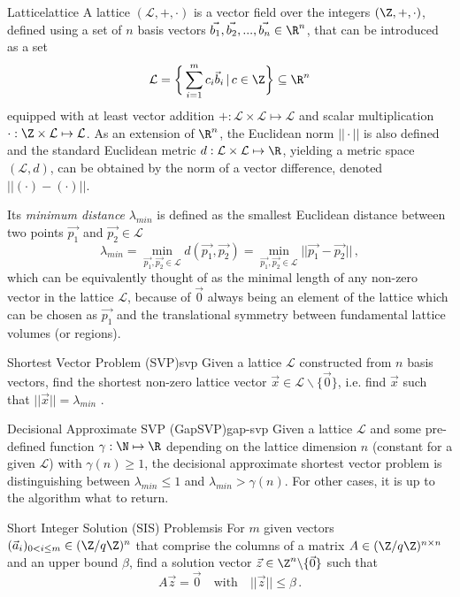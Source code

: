 \newcommand{\lat}{\mathcal{L}}
\begin{definition}{Lattice}{lattice}
  A lattice $(\lat, +, \cdot)$ is a vector field over the integers $(\Z, +, \cdot)$, defined using a set of $n$
  basis vectors $\vec{b_1}, \vec{b_2}, ..., \vec{b_n} \in \R^n$, that can be introduced as a set
  $$\lat = \bigg\{\sum_{i=1}^m c_i \vec{b}_i \,|\, c \in \Z\bigg\} \subseteq \R^n$$
  equipped with at least vector addition $+: \lat \times \lat \mapsto \lat$
  and scalar multiplication $\cdot: \Z \times \lat \mapsto \lat$.
  As an extension of $\R^n$, the Euclidean norm $||\cdot||$ is also defined and
  the standard Euclidean metric $d: \lat \times \lat \mapsto \R$, yielding a metric space $(\lat, d)$,
  can be obtained by the norm of a vector difference, denoted $||(\cdot) - (\cdot)||$.
\end{definition}

Its \textit{minimum distance} $\lambda_{min}$ is defined as the smallest Euclidean distance
between two points $\vec{p_1}$ and $\vec{p_2} \in \lat$
$$\lambda_{min} = \min_{\vec{p_1}, \vec{p_2} \in \lat} d(\vec{p_1}, \vec{p_2}) =
  \min_{\vec{p_1}, \vec{p_2} \in \lat} ||\vec{p_1} - \vec{p_2}|| \,,$$
which can be equivalently thought of as the minimal length of any non-zero vector in the lattice $\lat$,
because of $\vec{0}$ always being an element of the lattice which can be chosen as $\vec{p_1}$
and the translational symmetry between fundamental lattice volumes (or regions).

\begin{definition}{Shortest Vector Problem (SVP)}{svp}
  Given a lattice $\lat$ constructed from $n$ basis vectors,
  find the shortest non-zero lattice vector $\vec{x} \in \lat \backslash \{\vec{0}\}$,
  i.e. find $\vec{x}$ such that $||\vec{x}|| = \lambda_{min}$ \parencite{2016-decade-of-lattice}.
\end{definition}

\begin{definition}{Decisional Approximate SVP (GapSVP)}{gap-svp}
  Given a lattice $\lat$ and some pre-defined function $\gamma: \N \mapsto \R$ depending
  on the lattice dimension $n$ (constant for a given $\lat$) with $\gamma(n) \geq 1$,
  the decisional approximate shortest vector problem is distinguishing
  between $\lambda_{min} \leq 1$ and $\lambda_{min} > \gamma(n)$.
  For other cases, it is up to the algorithm what to return.
\end{definition}

\begin{definition}{Short Integer Solution (SIS) Problem}{sis}
  For $m$ given vectors $(\vec{a}_i)_{0 < i \leq m} \in (\Z / q\Z)^n$ that comprise the columns of a matrix
  $A \in (\Z / q\Z)^{n \times n}$ and an upper bound $\beta$, find
  a solution vector $\vec{z} \in \Z^n \backslash \{\vec{0}\}$ such that
  $$A \vec{z} = \vec{0} \quad \mathrm{with} \quad ||\vec{z}|| \leq \beta\,.$$
\end{definition}

